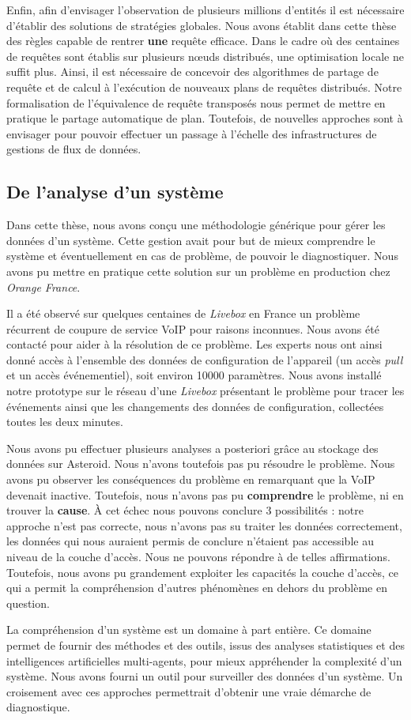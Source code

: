 Enfin, afin d'envisager l'observation de plusieurs millions d'entités il est nécessaire d'établir des solutions de stratégies globales. Nous avons établit dans cette thèse des règles capable de rentrer \textbf{une} requête efficace. Dans le cadre où des centaines de requêtes sont établis sur plusieurs nœuds distribués, une optimisation locale ne suffit plus. Ainsi, il est nécessaire de concevoir des algorithmes de partage de requête et de calcul à l'exécution de nouveaux plans de requêtes distribués. Notre formalisation de l'équivalence de requête transposés nous permet de mettre en pratique le partage automatique de plan. Toutefois, de nouvelles approches sont à envisager pour pouvoir effectuer un passage à l'échelle des infrastructures de gestions de flux de données.

\subsection{De l'analyse d'un système}
Dans cette thèse, nous avons conçu une méthodologie générique pour gérer les données d'un système. Cette gestion avait pour but de mieux comprendre le système et éventuellement en cas de problème, de pouvoir le diagnostiquer. Nous avons pu mettre en pratique cette solution sur un problème en production chez \textit{Orange France}.

Il a été observé sur quelques centaines de \textit{Livebox} en France un problème récurrent de coupure de service VoIP pour raisons inconnues. Nous avons été contacté pour aider à la résolution de ce problème. Les experts nous ont ainsi donné accès à l'ensemble des données de configuration de l'appareil (un accès \textit{pull} et un accès événementiel), soit environ 10000 paramètres. Nous avons installé notre prototype sur le réseau d'une \textit{Livebox} présentant le problème pour tracer les événements ainsi que les changements des données de configuration, collectées toutes les deux minutes.

Nous avons pu effectuer plusieurs analyses a posteriori grâce au stockage des données sur Asteroid. Nous n'avons toutefois pas pu résoudre le problème. Nous avons pu observer les conséquences du problème en remarquant que la VoIP devenait inactive. Toutefois, nous n'avons pas pu \textbf{comprendre} le problème, ni en trouver la \textbf{cause}. À cet échec nous pouvons conclure 3 possibilités : notre approche n'est pas correcte, nous n'avons pas su traiter les données correctement, les données qui nous auraient permis de conclure n'étaient pas accessible au niveau de la couche d'accès. Nous ne pouvons répondre à de telles affirmations. Toutefois, nous avons pu grandement exploiter les capacités la couche d'accès, ce qui a permit la compréhension d'autres phénomènes en dehors du problème en question.

La compréhension d'un système est un domaine à part entière. Ce domaine permet de fournir des méthodes et des outils, issus des analyses statistiques et des intelligences artificielles multi-agents, pour mieux appréhender la complexité d'un système. Nous avons fourni un outil pour surveiller des données d'un système. Un croisement avec ces approches permettrait d'obtenir une vraie démarche de diagnostique.
